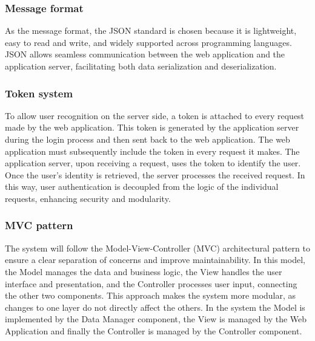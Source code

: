 \subsubsection{Message format}
As the message format, the JSON standard is chosen because it is lightweight, easy to read and write, and widely supported across programming languages. JSON allows seamless communication between the web application and the application server, facilitating both data serialization and deserialization.
\subsubsection{Token system}
To allow user recognition on the server side, a token is attached to every request made by the web application. This token is generated by the application server during the login process and then sent back to the web application. The web application must subsequently include the token in every request it makes. The application server, upon receiving a request, uses the token to identify the user. Once the user's identity is retrieved, the server processes the received request. In this way, user authentication is decoupled from the logic of the individual requests, enhancing security and modularity.
\subsubsection{MVC pattern}
The system will follow the Model-View-Controller (MVC) architectural pattern to ensure a clear separation of concerns and improve maintainability. In this model, the Model manages the data and business logic, the View handles the user interface and presentation, and the Controller processes user input, connecting the other two components. This approach makes the system more modular, as changes to one layer do not directly affect the others. In the system the Model is implemented by the Data Manager component, the View is managed by the Web Application and finally the Controller is managed by the Controller component.
